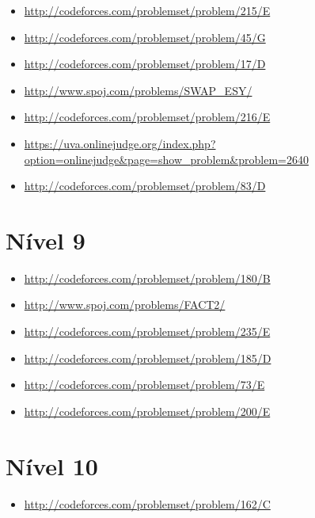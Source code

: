 \begin{itemize}
\item \url{http://codeforces.com/problemset/problem/215/E}
\item \url{http://codeforces.com/problemset/problem/45/G}
\item \url{http://codeforces.com/problemset/problem/17/D}
\item \url{http://www.spoj.com/problems/SWAP_ESY/}
\item \url{http://codeforces.com/problemset/problem/216/E}
\item \url{https://uva.onlinejudge.org/index.php?option=onlinejudge&page=show_problem&problem=2640}
\item \url{http://codeforces.com/problemset/problem/83/D}
\end{itemize}


\section{Nível 9}

\begin{itemize}
\item \url{http://codeforces.com/problemset/problem/180/B}
\item \url{http://www.spoj.com/problems/FACT2/}
\item \url{http://codeforces.com/problemset/problem/235/E}
\item \url{http://codeforces.com/problemset/problem/185/D}
\item \url{http://codeforces.com/problemset/problem/73/E}
\item \url{http://codeforces.com/problemset/problem/200/E}
\end{itemize}



\section{Nível 10}

\begin{itemize}
\item \url{http://codeforces.com/problemset/problem/162/C}
\end{itemize}



